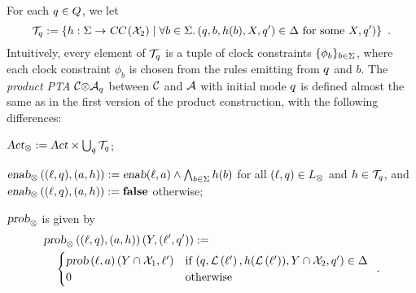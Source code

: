 For each $q\in Q$, we let
\[
\mathcal{T}_{q}:=\{h:\Sigma\rightarrow\mbox{\sl CC}\left(\mathcal{X}_2\right)\mid\forall b\in\Sigma.\left(q, b, h(b), X, q')\in\Delta\mbox{ for some }X, q'\right)\}\enskip.
\]
Intuitively, every element of $\mathcal{T}_{q}$ is a tuple of clock constraints $\{\phi_b\}_{b\in\Sigma}$, where each
clock constraint $\phi_b$ is chosen from the rules emitting from $q$ and $b$.
The \emph{product PTA} ${\mathcal{C}}{\otimes}{\mathcal{A}_q}$ between $\mathcal{C}$ and $\mathcal{A}$ with initial mode $q$ is defined
almost the same as in the first version of the product construction, with the following differences:
\begin{compactitem}
\item $\mbox{\sl Act}_\otimes:=\mbox{\sl Act}\times\bigcup_q\mathcal{T}_q$; %
\item $\mbox{\sl enab}_\otimes\left((\ell,q), (a,h)\right):=\mbox{\sl enab}(\ell,a)\wedge \bigwedge_{b\in\Sigma} h(b)$ for all $(\ell,q)\in L_\otimes$ and $h\in \mathcal{T}_q$, and $\mbox{\sl enab}_\otimes\left((\ell,q), (a,h)\right):=\mathbf{false}$ otherwise;
\item $\mbox{\sl prob}_\otimes$ is given by
\begin{align*}
&\prob_\otimes\left((\loc,\dtloc),(a,h)\right)(Y,(\loc',\dtloc')):=\\
&\quad\begin{cases}
\prob\left(\loc,a\right)(Y\cap \clocks_1,\loc') & \mbox{if } (\dtloc,\lbfunc\left(\loc'\right), h(\lbfunc\left(\loc'\right)), Y\cap \clocks_2, \dtloc')\in\rules\\%
0 & \mbox{otherwise}
\end{cases}\enskip.
\end{align*}
\end{compactitem}
